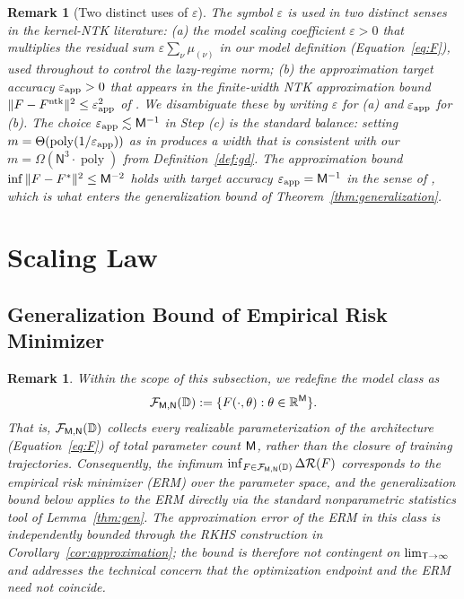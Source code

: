 \documentclass[11pt]{article}
\let\citet\citep
\theoremstyle{plain}
\newtheorem{remark}[theorem]{Remark}
\newcommand{\R}{\mathbb{R}}
\DeclareMathOperator{\poly}{poly}
\begin{document}
\begin{remark}[Two distinct uses of $\varepsilon$]\label{rem:eps_double}
The symbol $\varepsilon$ is used in two distinct senses in the kernel-NTK literature: (a) the {\it model scaling coefficient} $\varepsilon>0$ that multiplies the residual sum $\varepsilon\sum_\nu \mu_{(\nu)}$ in our model definition (Equation~\eqref{eq:F}), used throughout to control the lazy-regime norm; (b) the {\it approximation target accuracy} $\varepsilon_{\rm app}>0$ that appears in the finite-width NTK approximation bound $\|F-F^{\rm ntk}\|^2\le\varepsilon_{\rm app}^2$ of \citet{adh+19}. We disambiguate these by writing $\varepsilon$ for (a) and $\varepsilon_{\rm app}$ for (b). The choice $\varepsilon_{\rm app} \lesssim {\sf M}^{-1}$ in Step (c) is the standard balance: setting $m = \Theta(\poly(1/\varepsilon_{\rm app}))$ as in \citet{adh+19} produces a width that is consistent with our $m = \Omega(\mathsf{N}^3 \cdot \poly)$ from Definition~\ref{def:gd}. The approximation bound $\inf\|F-F^*\|^2 \le {\sf M}^{-2}$ holds with target accuracy $\varepsilon_{\rm app} = {\sf M}^{-1}$ in the sense of \citet{adh+19}, which is what enters the generalization bound of Theorem~\ref{thm:generalization}.
\end{remark}



\newpage


\section{Scaling Law}\label{app:proof_scaling_law}

\subsection{Generalization Bound of Empirical Risk Minimizer}\label{app_sub:erm}

\begin{remark}\label{rem:H1}
    Within the scope of this subsection, we redefine the model class as
    \begin{align*}
        {\cal F}_{\sf M, N}(\mathbb{D}) := \{F(\cdot, \theta) : \theta \in \R^{\sf M}\}.
    \end{align*}
    That is, ${\cal F}_{\sf M, N}(\mathbb{D})$ collects every realizable parameterization of the architecture (Equation~\eqref{eq:F}) of total parameter count $\sf M$, rather than the closure of training trajectories. Consequently, the infimum $\inf_{F \in {\cal F}_{\sf M, N}(\mathbb{D})} \Delta {\cal R}(F)$ corresponds to the empirical risk minimizer (ERM) over the parameter space, and the generalization bound below applies to the ERM directly via the standard nonparametric statistics tool of Lemma~\ref{thm:gen}. The approximation error of the ERM in this class is independently bounded through the RKHS construction in Corollary~\ref{cor:approximation}; the bound is therefore not contingent on $\lim_{{\sf T} \to \infty}$ and addresses the technical concern that the optimization endpoint and the ERM need not coincide.
\end{remark}
\end{document}
